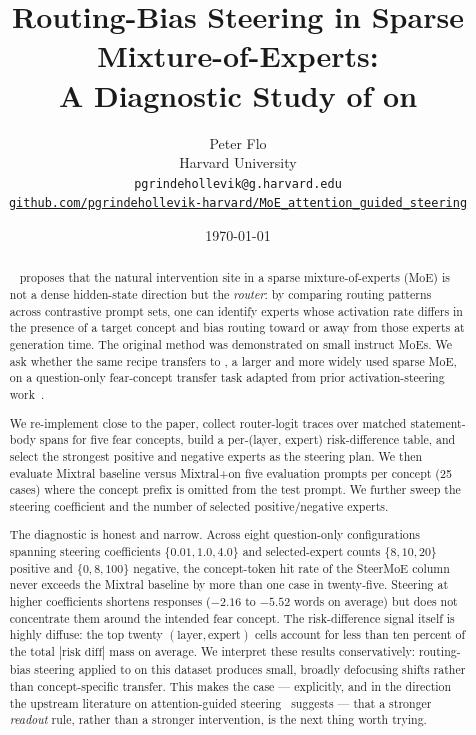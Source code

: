 \documentclass[11pt]{article}
\title{\textbf{Routing-Bias Steering in Sparse Mixture-of-Experts:\\
  A Diagnostic Study of \steermoe on \mixtral}}
\author{%
  Peter Flo\\
  Harvard University\\
  \texttt{pgrindehollevik@g.harvard.edu}\\[0.6em]
  \href{https://github.com/pgrindehollevik-harvard/MoE_attention_guided_steering}{%
    \nolinkurl{github.com/pgrindehollevik-harvard/MoE\_attention\_guided\_steering}}
}
\date{\today}
\begin{document}
\maketitle

\begin{abstract}
\steermoe~\citep{wang2024steermoe} proposes that the natural intervention site
in a sparse mixture-of-experts (MoE) is not a dense hidden-state direction but
the \emph{router}: by comparing routing patterns across contrastive prompt
sets, one can identify experts whose activation rate differs in the presence of
a target concept and bias routing toward or away from those experts at
generation time. The original method was demonstrated on small instruct MoEs.
We ask whether the same recipe transfers to \mixtral, a larger and more widely
used sparse MoE, on a question-only fear-concept transfer task adapted from
prior activation-steering work~\citep{liu2024iti, zou2023repe}.

We re-implement \steermoe close to the paper, collect router-logit traces over
matched statement-body spans for five fear concepts, build a per-(layer, expert)
risk-difference table, and select the strongest positive and negative experts as
the steering plan. We then evaluate Mixtral baseline versus
Mixtral+\steermoe on five evaluation prompts per concept (25 cases) where the
concept prefix is omitted from the test prompt. We further sweep the steering
coefficient and the number of selected positive/negative experts.

The diagnostic is honest and narrow. Across eight question-only configurations
spanning steering coefficients $\{0.01, 1.0, 4.0\}$ and selected-expert counts
$\{8, 10, 20\}$ positive and $\{0, 8, 100\}$ negative, the concept-token hit
rate of the SteerMoE column never exceeds the Mixtral baseline by more than one
case in twenty-five. Steering at higher coefficients shortens responses
($-2.16$ to $-5.52$ words on average) but does not concentrate them around the
intended fear concept. The risk-difference signal itself is highly diffuse:
the top twenty $(\text{layer},\text{expert})$ cells account for less than
ten percent of the total $|\text{risk diff}|$ mass on average. We interpret
these results conservatively: routing-bias steering applied to \mixtral on
this dataset produces small, broadly defocusing shifts rather than
concept-specific transfer. This makes the case --- explicitly, and in the
direction the upstream literature on attention-guided
steering~\citep{tan2024attentionguided} suggests --- that a stronger \emph{readout}
rule, rather than a stronger intervention, is the next thing worth trying.
\end{abstract}
\end{document}
